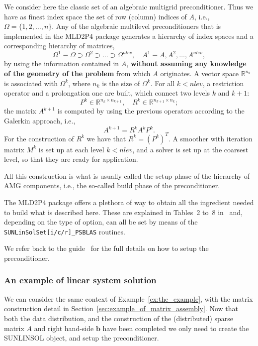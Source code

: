 \documentclass[twoside,a4paper]{refart}
\theoremstyle{definition}
\begin{document}
We consider here the classic set of an algebraic multigrid preconditioner. Thus we have as finest index space the set of row (column) indices of $A$, i.e.,
$\Omega = \{1, 2, \ldots, n\}$.
Any of the algebraic multilevel preconditioners that is implemented in the MLD2P4 package generates a hierarchy of index spaces and a corresponding hierarchy of matrices,
\[ \Omega^1 \equiv \Omega \supset \Omega^2 \supset \ldots \supset \Omega^{nlev},
\quad A^1 \equiv A, A^2, \ldots, A^{nlev}, \]
by using the information contained in $A$, \textbf{without assuming any
knowledge of the geometry of the problem} from which $A$ originates.
A vector space $\mathbb{R}^{n_{k}}$ is associated with $\Omega^k$,
where $n_k$ is the size of $\Omega^k$.
For all $k < nlev$, a restriction operator and a prolongation one are built,
which connect two levels $k$ and $k+1$:
\[
P^k \in \mathbb{R}^{n_k \times n_{k+1}}, \quad
R^k \in \mathbb{R}^{n_{k+1}\times n_k};
\]
the matrix $A^{k+1}$ is computed by using the previous operators according
to the Galerkin approach, i.e.,
\[
A^{k+1}=R^kA^kP^k.
\]
For the construction of $R^k$ we have that $R^k=(P^k)^T$.
A smoother with iteration matrix $M^k$ is set up at each level $k < nlev$, and a solver
is set up at the coarsest level, so that they are ready for application.

All this construction is what is usually called the setup phase of the hierarchy of AMG components, i.e., the so-called build phase of the preconditioner.

The MLD2P4 package offers a plethora of way to obtain all the ingredient needed to build what is described here. These are explained in Tables~2 to~8 in~\cite{mld2p4guide} and, depending on the type of option, can all be set by means of the \lstinline[style=CStyle]|SUNLinSolSet[i/c/r]_PSBLAS| routines.

We refer back to the guide~\cite{mld2p4guide} for the full details on how to setup the preconditioner.

\subsubsection{An example of linear system solution}

We can consider the same context of Example~\ref{ex:the_example}, with the matrix construction detail in Section~\ref{sec:example_of_matrix_assembly}. Now that both the data distribution, and the construction of the (distributed) sparse matrix $A$ and right hand-side $\mathbf{b}$ have been completed we only need to create the SUNLINSOL object, and setup the preconditioner.
\end{document}
